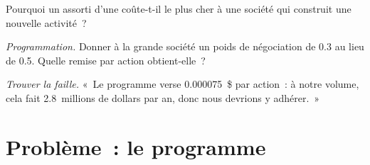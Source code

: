 \begin{exercise}[$\star\star$]\label{exo:fm:commercial-relationships-with-venues-brokers-and-vendors:6}
Pourquoi un  assorti d'une  coûte-t-il le plus cher à une société qui construit une nouvelle activité~?
\end{exercise}

\begin{exercise}[$\star\star\star$]\label{exo:fm:commercial-relationships-with-venues-brokers-and-vendors:7}
\emph{Programmation.} Donner à la grande société un poids de négociation de 0.3 au lieu de 0.5. Quelle remise par action obtient-elle~?
\end{exercise}

\begin{exercise}[$\star\star\star$]\label{exo:fm:commercial-relationships-with-venues-brokers-and-vendors:8}
\emph{Trouver la faille.} «~Le programme verse 0.000075~\$ par action~: à notre volume, cela fait 2.8~millions de dollars par an, donc nous devrions y adhérer.~»
\end{exercise}

\section{Problème~: le programme}

